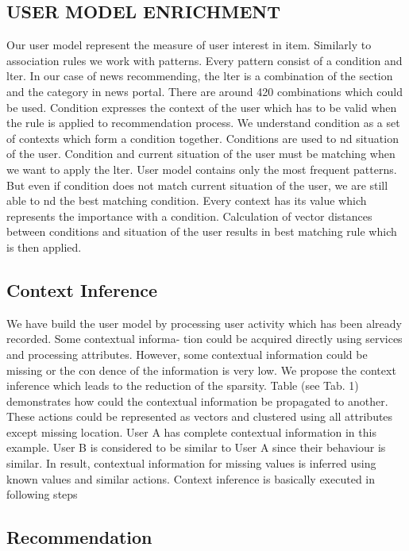 \documentclass[10pt]{extarticle}
\begin{document}
\begin{multicols}{2}
\section{USER MODEL ENRICHMENT}

Our user model represent the measure of user interest in
item.  Similarly to association rules we work with patterns.
Every pattern consist of a condition and  lter.  In our case
of  news  recommending,  the   lter  is  a  combination  of  the
section and the category in news portal.  There are around
420 combinations which could be used.
Condition expresses the context of the user which has to
be valid when the rule is applied to recommendation process.
We understand condition as a set of contexts which form a
condition together.  Conditions are used to  nd situation of
the user.  Condition and current situation of the user must
be matching when we want to apply the  lter.
User model contains only the most frequent patterns.  But
even  if  condition  does  not  match  current  situation  of  the
user, we are still able to  nd the best matching condition.
Every context has its value which represents the importance
with  a  condition.   Calculation  of  vector  distances  between
conditions and situation of the user results in best matching
rule which is then applied.

\subsection{Context Inference}

We have build the user model by processing user activity
which has been already recorded.  Some contextual informa-
tion could be acquired directly using services and processing
attributes.  However, some contextual information could be
missing or the con dence of the information is very low.  We
propose the context inference which leads to the reduction
of the sparsity.  Table (see Tab.  1) demonstrates how could
the contextual information be propagated to another.  These
actions could be represented as vectors and clustered using
all attributes except missing location.  User A has complete
contextual information in this example. User B is considered
to be similar to User A since their behaviour is similar.  In
result, contextual information for missing values is inferred
using known values and similar actions.
Context inference is basically executed in following steps

\subsection{Recommendation}


\end{multicols}
\end{document}
